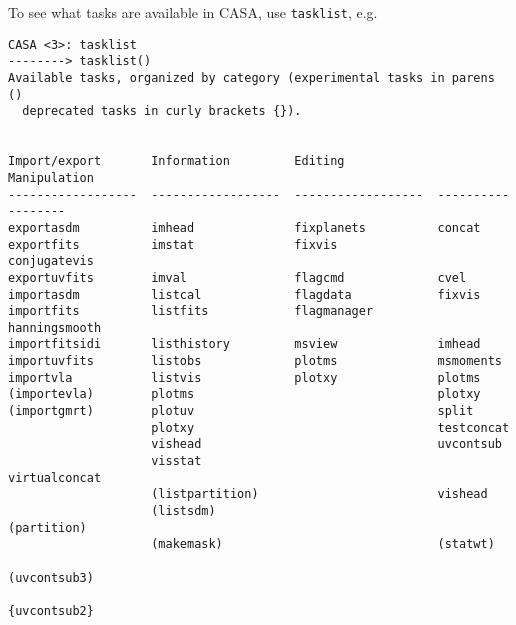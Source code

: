 To see what tasks are available in CASA, use {\tt tasklist}, e.g.
\small
\begin{verbatim}
CASA <3>: tasklist
--------> tasklist()
Available tasks, organized by category (experimental tasks in parens ()
  deprecated tasks in curly brackets {}).


Import/export       Information         Editing             Manipulation      
------------------  ------------------  ------------------  ------------------
exportasdm          imhead              fixplanets          concat            
exportfits          imstat              fixvis              conjugatevis      
exportuvfits        imval               flagcmd             cvel              
importasdm          listcal             flagdata            fixvis            
importfits          listfits            flagmanager         hanningsmooth     
importfitsidi       listhistory         msview              imhead            
importuvfits        listobs             plotms              msmoments         
importvla           listvis             plotxy              plotms            
(importevla)        plotms                                  plotxy            
(importgmrt)        plotuv                                  split             
                    plotxy                                  testconcat        
                    vishead                                 uvcontsub         
                    visstat                                 virtualconcat     
                    (listpartition)                         vishead           
                    (listsdm)                               (partition)       
                    (makemask)                              (statwt)          
                                                            (uvcontsub3)      
                                                            {uvcontsub2}      


\end{verbatim}
